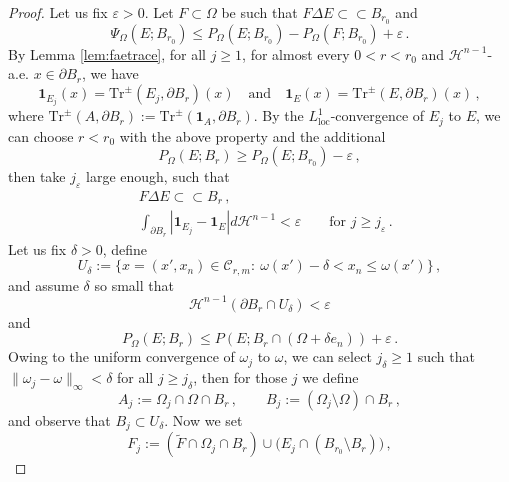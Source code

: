 \documentclass[a4paper,reqno,11pt]{amsart}
\newcommand{\e}{\varepsilon}
\newcommand{\Hau}{{\mathcal H}} %
\newcommand{\de}{\partial}
\newcommand{\loc}{\mathop{\mathrm{loc}}}
\newcommand{\difsim}{\Delta}
\newcommand{\ch}{\mathbf{1}}
\newcommand{\cC}{\mathcal{C}}
\newcommand{\pr}{P_{\Omega}}
\newcommand{\p}{P}
\newcommand{\dd}{d}
\newcommand{\Tr}{{\mathrm{Tr}}}
\begin{document}
\begin{proof}
Let us fix $\e > 0$. Let $F \subset \Omega$ be such that $F \difsim E \subset \subset B_{r_{0}}$ and
\begin{equation}\label{eq:PsiFcontroE}
 \Psi_{\Omega}(E;B_{r_{0}}) \le \pr(E;B_{r_{0}}) - \pr(F;B_{r_{0}}) + \e\, .
\end{equation}
By Lemma \ref{lem:faetrace}, for all $j \geq 1$, for almost every $0 < r < r_{0}$ and $\Hau^{n-1}$-a.e. $x\in \de B_{r}$, we have 
\begin{equation}\label{eq:equaltraces}
\ch_{E_{j}}(x) = \Tr^{\pm}(E_{j},\de B_{r})(x)\quad \text{and} \quad  \ch_{E}(x) = \Tr^{\pm}(E,\de B_{r})(x)\,,
\end{equation}
where $\Tr^{\pm}(A,\de B_{r}) := \Tr^{\pm}(\ch_A, \de B_{r})$. By the $L^{1}_{\loc}$-convergence of $E_{j}$ to $E$, we can choose $r<r_{0}$ with the above property and the additional
\begin{equation}\label{eq:perrrzero}
\pr(E;B_{r}) \ge \pr(E;B_{r_{0}}) - \e\,,
\end{equation}
then take $j_{\e}$ large enough, such that 
\begin{align} \label{eq:difcompr}
&F \difsim E \subset \subset B_{r}\,,\\\label{eq:tracesmall}
&\int_{\de B_{r}} |\ch_{E_{j}} - \ch_{E}| \dd \Hau^{n-1} <\e\qquad \text{for $j\ge j_{\e}$} \, .
\end{align}
Let us fix $\delta>0$, define
\[
U_\delta := \big\{x=(x',x_{n})\in \cC_{r,m}:\ \omega(x')-\delta < x_{n}\le \omega(x')\big\}\,,
\]
and assume $\delta$ so small that 
\begin{equation}\label{eq:Haudeltaeps}
\Hau^{n-1}(\de B_{r}\cap U_{\delta})<\e
\end{equation}
and
\begin{equation}\label{eq:peromegadelta}
\pr(E;B_{r}) \le \p(E;B_{r}\cap(\Omega + \delta e_{n})) + \e\,.
\end{equation}
Owing to the uniform convergence of $\omega_{j}$ to $\omega$, we can select $j_\delta \geq 1$ such that $\|\omega_{j}-\omega\|_{\infty} <\delta$ for all $j\ge j_{\delta}$, then for those $j$ we define
\begin{equation*}
A_j := \Omega_{j} \cap \Omega \cap B_r \, , \qquad B_j := (\Omega_{j} \setminus \Omega) \cap B_r \,,
\end{equation*}
and observe that $B_j \subset U_\delta$. Now we set
\begin{equation} \label{eq:Fj}
F_{j} := (\tilde{F} \cap \Omega_{j} \cap B_r) \cup \big(E_{j} \cap (B_{r_{0}} \setminus B_{r})\big) \,,

\end{equation}
\end{proof}
\end{document}
